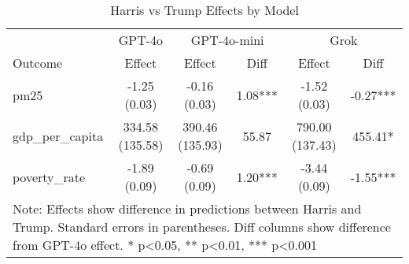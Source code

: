 \begin{table}[htbp]
    \centering
    \caption{Harris vs Trump Effects by Model}
    \begin{tabular}{lccccc}
    \hline
    & \multicolumn{1}{c}{GPT-4o} & \multicolumn{2}{c}{GPT-4o-mini} & \multicolumn{2}{c}{Grok} \\
    Outcome & Effect & Effect & Diff & Effect & Diff \\
    \hline
    pm25 & -1.25 (0.03) & -0.16 (0.03) & 1.08*** & -1.52 (0.03) & -0.27*** \\
gdp_per_capita & 334.58 (135.58) & 390.46 (135.93) & 55.87 & 790.00 (137.43) & 455.41* \\
poverty_rate & -1.89 (0.09) & -0.69 (0.09) & 1.20*** & -3.44 (0.09) & -1.55*** \\
\hline
    \multicolumn{6}{p{0.95\textwidth}}{\small Note: Effects show difference in predictions between Harris and Trump. 
    Standard errors in parentheses. Diff columns show difference from GPT-4o effect. * p<0.05, ** p<0.01, *** p<0.001} \\
    \end{tabular}
    \label{tab:model_comparison}
    \end{table}